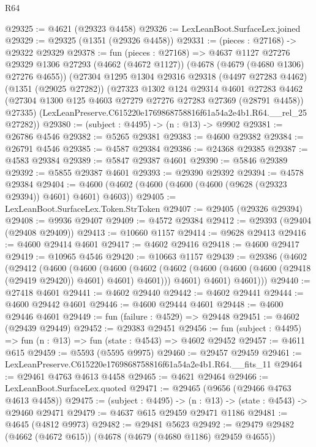 \begin{lexlean}{R64}
\begin{coremodule}
@29325 := @4621 (@29323 @4458)
@29326 := LexLeanBoot.SurfaceLex.joined
@29329 := @29325 (@1351 (@29326 @4458))
@29331 := (pieces : @27168) -> @29322 @29329
@29378 := fun (pieces : @27168) =>
  @4637
    @1127
    @27276
    @29329
    @1306
    @27293
    (@4662 (@4672 @1127))
    (@4678 (@4679 (@4680 @1306) @27276 @4655))
    (@27304
      @1295
      @1304
      @29316
      @29318
      (@4497 @27283 @4462)
      (@1351 (@29025 @27282))
      (@27323
        @1302
        @124
        @29314
        @4601
        @27283
        @4462
        (@27304 @1300 @125 @4603 @27279 @27276 @27283 @27369 (@28791 @4458))
        @27335)
      (LexLeanPreserve.C615220e1769868758816f61a54a2e4b1.R64.__rel_25 @27282))
@29380 := (subject : @4495) -> (n : @13) -> @9902
@29381 := @26786 @4546
@29382 := @5265 @29381
@29383 := @4600 @29382
@29384 := @26791 @4546
@29385 := @4587 @29384
@29386 := @24368 @29385
@29387 := @4583 @29384
@29389 := @5847 @29387 @4601
@29390 := @5846 @29389
@29392 := @5855 @29387 @4601
@29393 := @29390 @29392
@29394 := @4578 @29384
@29404 := @4600 (@4602 (@4600 (@4600 (@4600 (@9628 (@29323 @29394)) @4601) @4601) @4603))
@29405 := LexLeanBoot.SurfaceLex.Token.StrToken
@29407 := @29405 (@29326 @29394)
@29408 := @9936 @29407
@29409 := @4572 @29384
@29412 := @29393 (@29404 (@29408 @29409))
@29413 := @10660 @1157
@29414 := @9628 @29413
@29416 := @4600 @29414 @4601
@29417 := @4602 @29416
@29418 := @4600 @29417
@29419 := @10965 @4546
@29420 := @10663 @1157
@29439 := @29386
    (@4602
      (@29412
        (@4600
          (@4600
            (@4600
              (@4602 (@4602 (@4600 (@4600 (@4600 (@29418 (@29419 @29420)) @4601) @4601) @4601)))
              @4601)
            @4601)
          @4601)))
@29440 := @27418 @4601
@29441 := @4602 @29440
@29442 := @4602 @29441
@29444 := @4600 @29442 @4601
@29446 := @4600 @29444 @4601
@29448 := @4600 @29446 @4601
@29449 := fun (failure : @4529) => @29448
@29451 := @4602 (@29439 @29449)
@29452 := @29383 @29451
@29456 := fun (subject : @4495) => fun (n : @13) => fun (state : @4543) => @4602 @29452
@29457 := @4611 @615
@29459 := @5593 (@5595 @9975)
@29460 := @29457 @29459
@29461 := LexLeanPreserve.C615220e1769868758816f61a54a2e4b1.R64.__fits_11
@29464 := @29461 @4763 @4613 @4458
@29465 := @4621 @29464
@29466 := LexLeanBoot.SurfaceLex.quoted
@29471 := @29465 (@9656 (@29466 @4763 @4613 @4458))
@29475 := (subject : @4495) -> (n : @13) -> (state : @4543) -> @29460 @29471
@29479 := @4637 @615 @29459 @29471 @1186
@29481 := @4645 (@4812 @9973)
@29482 := @29481 @5623
@29492 := @29479 @29482 (@4662 (@4672 @615)) (@4678 (@4679 (@4680 @1186) @29459 @4655))

\end{coremodule}
\end{lexlean}
